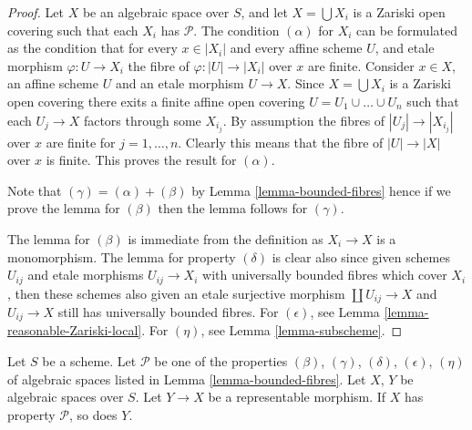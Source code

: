 \begin{proof}
Let $X$ be an algebraic space over $S$, and let $X = \bigcup X_i$ is a
Zariski open covering such that each $X_i$ has $\mathcal{P}$.
The condition $(\alpha)$ for $X_i$ can be formulated as the condition
that for every $x \in |X_i|$ and every affine scheme $U$, and etale morphism
$\varphi : U \to X_i$ the fibre of $\varphi : |U| \to |X_i|$
over $x$ are finite. Consider $x \in X$, an affine scheme $U$ and
an etale morphism $U \to X$. Since $X = \bigcup X_i$ is a
Zariski open covering there exits a finite affine open covering
$U = U_1 \cup \ldots \cup U_n$ such that each $U_j \to X$ factors through
some $X_{i_j}$. By assumption the fibres of $|U_j | \to |X_{i_j}|$
over $x$ are finite for $j = 1, \ldots, n$. Clearly this means that
the fibre of $|U| \to |X|$ over $x$ is finite.
This proves the result for $(\alpha)$.

\medskip\noindent
Note that $(\gamma) = (\alpha) + (\beta)$ by
Lemma \ref{lemma-bounded-fibres}
hence if we prove the lemma for $(\beta)$ then the lemma follows for
$(\gamma)$.

\medskip\noindent
The lemma for $(\beta)$ is immediate from the definition as $X_i \to X$ is
a monomorphism. The lemma for property $(\delta)$ is clear also since given
schemes $U_{ij}$ and etale morphisms $U_{ij} \to X_i$ with universally
bounded fibres which cover $X_i$, then these schemes also given an
etale surjective morphism $\coprod U_{ij} \to X$ and $U_{ij} \to X$
still has universally bounded fibres. For $(\epsilon)$, see
Lemma \ref{lemma-reasonable-Zariski-local}.
For $(\eta)$, see Lemma \ref{lemma-subscheme}.
\end{proof}

\begin{lemma}
\label{lemma-representable-properties}
Let $S$ be a scheme.
Let $\mathcal{P}$ be one of the properties $(\beta)$, $(\gamma)$, $(\delta)$,
$(\epsilon)$, $(\eta)$
of algebraic spaces listed in Lemma \ref{lemma-bounded-fibres}.
Let $X$, $Y$ be algebraic spaces over $S$.
Let $Y \to X$ be a representable morphism.
If $X$ has property $\mathcal{P}$, so does $Y$.
\end{lemma}

